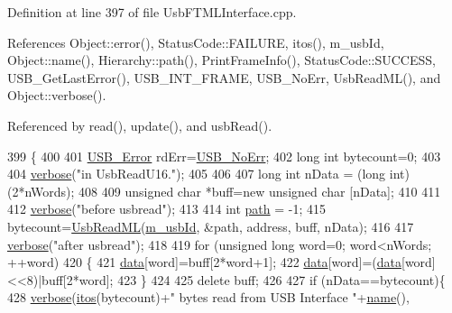 Definition at line 397 of file Usb\+F\+T\+M\+L\+Interface.\+cpp.



References Object\+::error(), Status\+Code\+::\+F\+A\+I\+L\+U\+RE, itos(), m\+\_\+usb\+Id, Object\+::name(), Hierarchy\+::path(), Print\+Frame\+Info(), Status\+Code\+::\+S\+U\+C\+C\+E\+SS, U\+S\+B\+\_\+\+Get\+Last\+Error(), U\+S\+B\+\_\+\+I\+N\+T\+\_\+\+F\+R\+A\+ME, U\+S\+B\+\_\+\+No\+Err, Usb\+Read\+M\+L(), and Object\+::verbose().



Referenced by read(), update(), and usb\+Read().


\begin{DoxyCode}
399                                                                \{
400   
401   \hyperlink{LALUsbML_8h_aa7e5a2302774d5aa1d48a2a1cfc46e86}{USB\_Error} rdErr=\hyperlink{LALUsbML_8h_ab44759ae95dd86cbc2855adf525c43cd}{USB\_NoErr};
402   \textcolor{keywordtype}{long} \textcolor{keywordtype}{int} bytecount=0;
403 
404   \hyperlink{classObject_a83d2db2df682907ea1115ad721c1c4a1}{verbose}(\textcolor{stringliteral}{"in UsbReadU16."});
405 
406 
407   \textcolor{keywordtype}{long} \textcolor{keywordtype}{int} nData = (\textcolor{keywordtype}{long} int)(2*nWords);
408   
409   \textcolor{keywordtype}{unsigned} \textcolor{keywordtype}{char} *buff=\textcolor{keyword}{new} \textcolor{keywordtype}{unsigned} \textcolor{keywordtype}{char} [nData];
410 
411   
412   \hyperlink{classObject_a83d2db2df682907ea1115ad721c1c4a1}{verbose}(\textcolor{stringliteral}{"before usbread"});
413 
414   \textcolor{keywordtype}{int} \hyperlink{classHierarchy_aa7990fa7caf132d83e361ce033c6c65a}{path}  = -1;
415   bytecount=\hyperlink{LALUsbML_8h_a540320392908ba7d57bcc168916a82d4}{UsbReadML}(\hyperlink{classUsbFTMLInterface_aab6754587c303660d5c498ce34a2b4c8}{m\_usbId}, &path, address, buff, nData);
416   
417   \hyperlink{classObject_a83d2db2df682907ea1115ad721c1c4a1}{verbose}(\textcolor{stringliteral}{"after usbread"});
418   
419   \textcolor{keywordflow}{for} (\textcolor{keywordtype}{unsigned} \textcolor{keywordtype}{long} word=0; word<nWords; ++word)
420   \{
421     \hyperlink{namespaceshell_a5ea2525995cedc3efd69ea8a7f034d1e}{data}[word]=buff[2*word+1];
422     \hyperlink{namespaceshell_a5ea2525995cedc3efd69ea8a7f034d1e}{data}[word]=(\hyperlink{namespaceshell_a5ea2525995cedc3efd69ea8a7f034d1e}{data}[word]<<8)|buff[2*word];
423   \}
424 
425   \textcolor{keyword}{delete} buff;
426 
427   \textcolor{keywordflow}{if} (nData==bytecount)\{
428     \hyperlink{classObject_a83d2db2df682907ea1115ad721c1c4a1}{verbose}(\hyperlink{Tools_8h_af330027dbdafb9a30768b3613c553e60}{itos}(bytecount)+\textcolor{stringliteral}{" bytes read from USB Interface "}+\hyperlink{classObject_a300f4c05dd468c7bb8b3c968868443c1}{name}(),

\end{DoxyCode}
